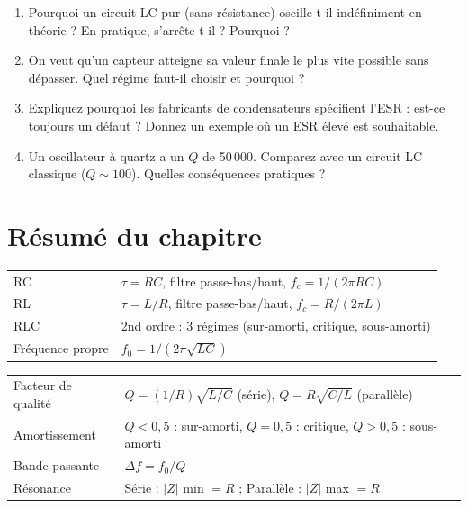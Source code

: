 \documentclass[12pt,a4paper,twoside]{book}
\begin{document}
\begin{enumerate}[nosep]
\item Pourquoi un circuit LC pur (sans résistance) oscille-t-il indéfiniment en théorie ? En pratique, s'arrête-t-il ? Pourquoi ?
\item On veut qu'un capteur atteigne sa valeur finale le plus vite possible sans dépasser. Quel régime faut-il choisir et pourquoi ?
\item Expliquez pourquoi les fabricants de condensateurs spécifient l'ESR : est-ce toujours un défaut ? Donnez un exemple où un ESR élevé est souhaitable.
\item Un oscillateur à quartz a un $Q$ de 50\,000. Comparez avec un circuit LC classique ($Q \sim 100$). Quelles conséquences pratiques ?
\end{enumerate}

\section*{Résumé du chapitre}

\begin{bases}[title={\color{white} Résumé --- Les Bases}]
\begin{center}
\renewcommand{\arraystretch}{1.3}
\begin{tabular}{p{4cm}p{9cm}}
\toprule
RC & $\tau = RC$, filtre passe-bas/haut, $f_c = 1/(2\pi RC)$ \\
RL & $\tau = L/R$, filtre passe-bas/haut, $f_c = R/(2\pi L)$ \\
RLC & 2nd ordre : 3 régimes (sur-amorti, critique, sous-amorti) \\
Fréquence propre & $f_0 = 1/(2\pi\sqrt{LC})$ \\
\bottomrule
\end{tabular}
\end{center}
\end{bases}

\begin{approfondissement}[title={\color{white} Résumé --- Approfondissement}]
\begin{center}
\renewcommand{\arraystretch}{1.3}
\begin{tabular}{p{4cm}p{9cm}}
\toprule
Facteur de qualité & $Q = (1/R)\sqrt{L/C}$ (série), $Q = R\sqrt{C/L}$ (parallèle) \\
Amortissement & $Q < 0{,}5$ : sur-amorti, $Q = 0{,}5$ : critique, $Q > 0{,}5$ : sous-amorti \\
Bande passante & $\Delta f = f_0/Q$ \\
Résonance & Série : $|Z|$ min $= R$ ; Parallèle : $|Z|$ max $= R$ \\
\bottomrule
\end{tabular}
\end{center}
\end{approfondissement}
\end{document}
